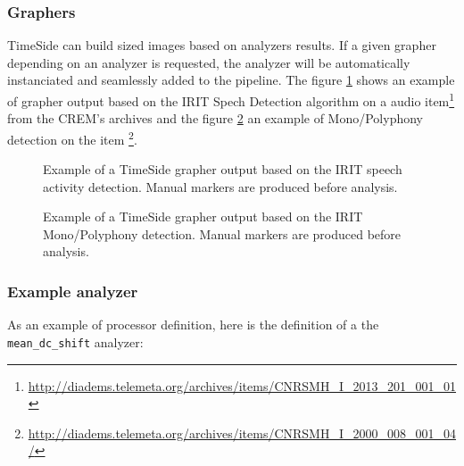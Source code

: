 \documentclass{article}
\begin{document}
\subsubsection{Graphers}

TimeSide can build sized images based on analyzers results. If a given grapher depending on an analyzer is requested, the analyzer will be automatically instanciated and seamlessly added to the pipeline. The figure \ref{fig:speech} shows an example of grapher output based on the IRIT Spech Detection algorithm on a audio item\footnote{\tiny{\url{http://diadems.telemeta.org/archives/items/CNRSMH_I_2013_201_001_01}}} from the CREM's archives and the figure \ref{fig:monopoly} an example of Mono/Polyphony detection on the item \footnote{\tiny{\url{http://diadems.telemeta.org/archives/items/CNRSMH_I_2000_008_001_04/}}}.

\begin{figure}
 \centerline{}
 \caption{Example of a TimeSide grapher output based on the IRIT speech activity detection. Manual markers are produced before analysis.}
 \label{fig:speech}
\end{figure}

\begin{figure}
 \centerline{}
 \caption{Example of a TimeSide grapher output based on the IRIT Mono/Polyphony detection. Manual markers are produced before analysis.}
 \label{fig:monopoly}
\end{figure}


\subsubsection{Example analyzer}

As an example of processor definition, here is the definition of a the \verb|mean_dc_shift| analyzer:
\end{document}

